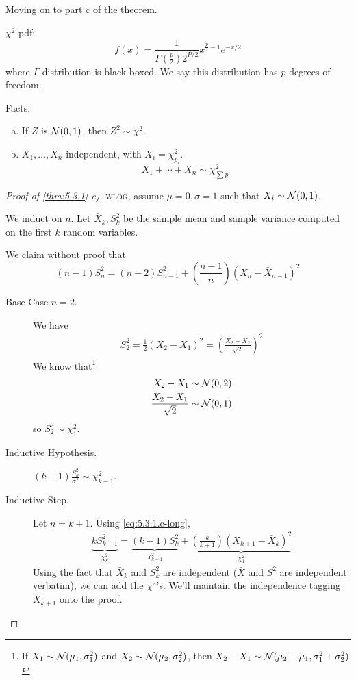 Moving on to part c of the theorem.

$\chi^2$ pdf:
\[f(x) = \frac{1}{\Gamma\left( \frac{p}{2} \right) 2^{P/2}} x^{\frac{p}{2}-1}e^{-x/2}\]
where $\Gamma$ distribution is black-boxed. We say this distribution has $p$ degrees of freedom.

Facts:
\begin{enumerate}[a)]
    \item If $Z$ is $\mathcal N(0, 1)$, then $Z^2\sim \chi^2$.
    \item $X_1, \dots, X_n$ independent, with $X_i = \chi^2_{p_i}$.
          \[X_1 + \cdots + X_n \sim \chi^2_{\sum p_i}\]
\end{enumerate}

\begin{proof}[Proof of \cref{thm:5.3.1} c)]
    \textsc{wlog}, assume $\mu = 0, \sigma = 1$ such that $X_i \sim \mathcal N(0, 1)$.

    We induct on $n$. Let $\bar{X}_k, S^2_k$ be the sample mean and sample variance computed on the first $k$ random variables.

    We claim without proof that
    \begin{equation}\label{eq:5.3.1.c-long}
        (n-1) S_n^2 = (n-2)S_{n-1}^2 + \left( \frac{n-1}{n} \right)\left( X_n - \bar{X}_{n-1} \right)^2
    \end{equation}

    \begin{description}
        \item[Base Case $n=2$.] We have
            \begin{align*}
                S_2^2 = \frac{1}{2}(X_2 - X_1)^2 = \left( \frac{X_2 - X_2}{\sqrt{2}} \right)^2
            \end{align*}
            We know that\footnote{If $X_1\sim \mathcal N(\mu_1, \sigma_1^2)$ and $X_2\sim \mathcal N(\mu_2, \sigma_2^2)$, then $X_2 - X_1\sim \mathcal N(\mu_2-\mu_1, \sigma_1^2 + \sigma_2^2)$}
            \begin{align*}
                X_2 - X_1                  & \sim \mathcal N(0, 2) \\
                \frac{X_2 - X_1}{\sqrt{2}} & \sim \mathcal N(0, 1)
            \end{align*}
            so $S_2^2\sim \chi_1^2$.
        \item[Inductive Hypothesis.] $(k-1)\frac{S_k^2}{\sigma^2} \sim \chi_{k-1}^2$.
        \item[Inductive Step.] Let $n=k+1$. Using \cref{eq:5.3.1.c-long},
            \begin{align*}
                \underbrace{kS_{k+1}^2}_{\chi_k^2} = \underbrace{(k-1)S_k^2}_{\chi_{k-1}^2} + \underbrace{\left( \frac{k}{k+1} \right)\left( X_{k+1} - \bar{X}_k \right)^2}_{\chi_1^2}
            \end{align*}
            Using the fact that $\bar{X}_k$ and $S_{k}^2$ are independent ($\bar{X}$ and $S^2$ are independent verbatim), we can add the $\chi^2$'s. We'll maintain the independence tagging $X_{k+1}$ onto the proof.


\end{description}
\end{proof}
